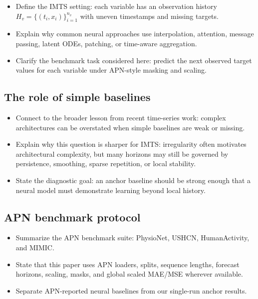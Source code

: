 \documentclass{article}
\begin{document}
\begin{itemize}
    \item Define the IMTS setting: each variable has an observation history
    $H_v=\{(t_i,x_i)\}_{i=1}^{n_v}$ with uneven timestamps and missing targets.
    \item Explain why common neural approaches use interpolation, attention,
    message passing, latent ODEs, patching, or time-aware aggregation.
    \item Clarify the benchmark task considered here: predict the next observed
    target values for each variable under APN-style masking and scaling.
\end{itemize}

\subsection{The role of simple baselines}

\begin{itemize}
    \item Connect to the broader lesson from recent time-series work: complex
    architectures can be overstated when simple baselines are weak or missing.
    \item Explain why this question is sharper for IMTS: irregularity often
    motivates architectural complexity, but many horizons may still be governed
    by persistence, smoothing, sparse repetition, or local stability.
    \item State the diagnostic goal: an anchor baseline should be strong enough
    that a neural model must demonstrate learning beyond local history.
\end{itemize}

\subsection{APN benchmark protocol}

\begin{itemize}
    \item Summarize the APN benchmark suite: PhysioNet, USHCN, HumanActivity,
    and MIMIC.
    \item State that this paper uses APN loaders, splits, sequence lengths,
    forecast horizons, scaling, masks, and global scaled MAE/MSE wherever
    available.
    \item Separate APN-reported neural baselines from our single-run anchor
    results.
\end{itemize}
\end{document}
